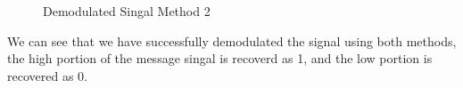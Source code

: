 \documentclass[12pt]{article}
\begin{document}
\begin{figure}[H]
    \centering
    \caption{Demodulated Singal Method 2}
\end{figure}
We can see that we have successfully demodulated the signal using both methods, the high portion of the message singal is recoverd as 1, and the low portion is recovered as 0.
\end{document}

